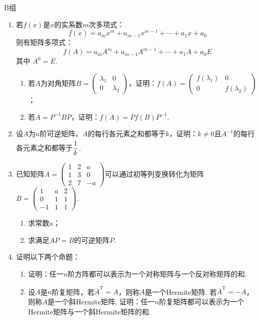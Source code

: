 \centerline{\heiti B组}
\begin{enumerate}
    \item 若$f(x)$是$x$的实系数$m$次多项式：
          \[f(x)=a_mx^m+a_{m-1}x^{m-1}+\cdots+a_1x+a_0\]
          则有矩阵多项式：
          \[f(A)=a_mA^m+a_{m-1}A^{m-1}+\cdots+a_1A+a_0E\]
          其中 $A^0=E$.
          \begin{enumerate}
              \item 若$A$为对角矩阵$B=\begin{pmatrix}
                            \lambda_1 & 0 \\ 0 & \lambda_2
                        \end{pmatrix}$，证明：$f(A)=\begin{pmatrix}
                            f(\lambda_1) & 0 \\ 0 & f(\lambda_2)
                        \end{pmatrix}$；

              \item 若$A=P^{-1}BP$，证明：$f(A)=Pf(B)P^{-1}$.
          \end{enumerate}

    \item 设$A$为$n$阶可逆矩阵，$A$的每行各元素之和都等于$k$，证明：$k \neq 0$且$A^{-1}$的每行各元素之和都等于$\vphantom{\cfrac{1}{k}}\dfrac{1}{k}$.

    \item 已知矩阵$A=\begin{pmatrix}1 & 2 & a  \\
               1 & 3 & 0  \\
               2 & 7 & -a\end{pmatrix}$可以通过初等列变换转化为矩阵$B=\begin{pmatrix}1  & a & 2 \\
               0  & 1 & 1 \\
               -1 & 1 & 1\end{pmatrix}$.
          \begin{enumerate}
              \item 求常数$a$；

              \item 求满足$AP=B$的可逆矩阵$P$.
          \end{enumerate}

          \item 证明以下两个命题：
          \begin{enumerate}
              \item 证明：任一$n$阶方阵都可以表示为一个对称矩阵与一个反对称矩阵的和.
              \item 设$A$是$n$阶复矩阵，若$\overline{A}^\mathrm{T}=A$，则称$A$是一个Hermite矩阵. 若$\overline{A}^\mathrm{T}=-A$，则称$A$是一个斜Hermite矩阵. 证明：任一$n$阶复矩阵都可以表示为一个Hermite矩阵与一个斜Hermite矩阵的和.
          \end{enumerate}


\end{enumerate}
